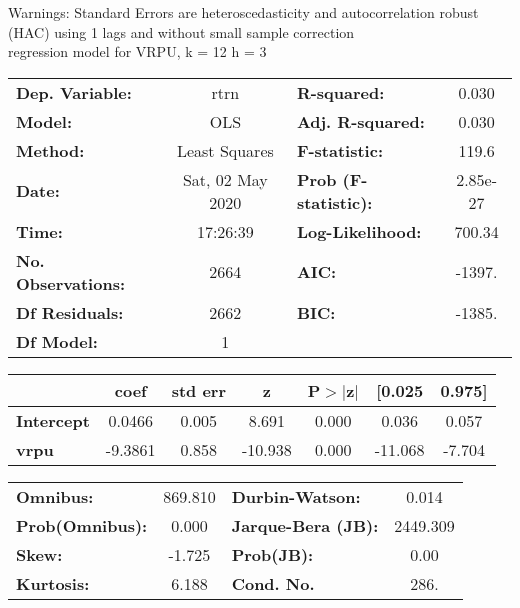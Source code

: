 Warnings: \newline
 [1] Standard Errors are heteroscedasticity and autocorrelation robust (HAC) using 1 lags and without small sample correction\\ 

regression model for VRPU, k = 12 h = 3\begin{center}
\begin{tabular}{lclc}
\toprule
\textbf{Dep. Variable:}    &       rtrn       & \textbf{  R-squared:         } &     0.030   \\
\textbf{Model:}            &       OLS        & \textbf{  Adj. R-squared:    } &     0.030   \\
\textbf{Method:}           &  Least Squares   & \textbf{  F-statistic:       } &     119.6   \\
\textbf{Date:}             & Sat, 02 May 2020 & \textbf{  Prob (F-statistic):} &  2.85e-27   \\
\textbf{Time:}             &     17:26:39     & \textbf{  Log-Likelihood:    } &    700.34   \\
\textbf{No. Observations:} &        2664      & \textbf{  AIC:               } &    -1397.   \\
\textbf{Df Residuals:}     &        2662      & \textbf{  BIC:               } &    -1385.   \\
\textbf{Df Model:}         &           1      & \textbf{                     } &             \\
\bottomrule
\end{tabular}
\begin{tabular}{lcccccc}
                   & \textbf{coef} & \textbf{std err} & \textbf{z} & \textbf{P$> |$z$|$} & \textbf{[0.025} & \textbf{0.975]}  \\
\midrule
\textbf{Intercept} &       0.0466  &        0.005     &     8.691  &         0.000        &        0.036    &        0.057     \\
\textbf{vrpu}      &      -9.3861  &        0.858     &   -10.938  &         0.000        &      -11.068    &       -7.704     \\
\bottomrule
\end{tabular}
\begin{tabular}{lclc}
\textbf{Omnibus:}       & 869.810 & \textbf{  Durbin-Watson:     } &    0.014  \\
\textbf{Prob(Omnibus):} &   0.000 & \textbf{  Jarque-Bera (JB):  } & 2449.309  \\
\textbf{Skew:}          &  -1.725 & \textbf{  Prob(JB):          } &     0.00  \\
\textbf{Kurtosis:}      &   6.188 & \textbf{  Cond. No.          } &     286.  \\
\bottomrule
\end{tabular}
\end{center}

